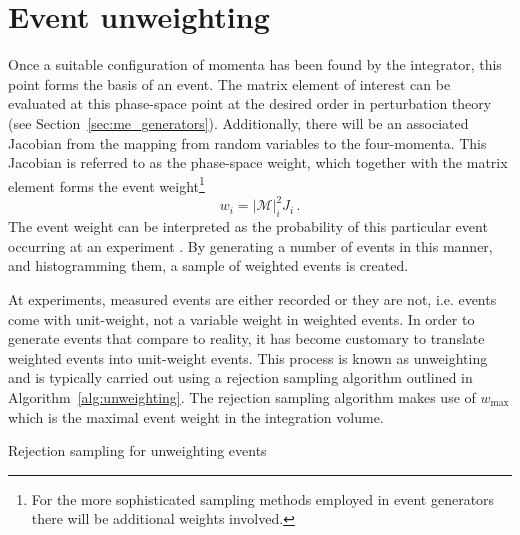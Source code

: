 \documentclass[main.tex]{subfiles}
\begin{document}
    \section{Event unweighting}\label{sec:unweighting}
    Once a suitable configuration of momenta
    has been found by the integrator, this point forms the basis of an
    event. The matrix element of interest can be evaluated at
    this phase-space point at the desired order in perturbation
    theory (see Section~\ref{sec:me_generators}). Additionally, there will be an associated Jacobian
    from the mapping from random variables to the four-momenta.
    This Jacobian is referred to as the phase-space weight, which together
    with the matrix element forms the event weight\footnote{For
    the more sophisticated sampling methods employed in event generators
    there will be additional weights involved.}
    \begin{equation}\label{eqn:event_weight}
        w_{i} = |\mathcal{M}|_{i}^{2} J_{i} \, .
    \end{equation}
    The event weight can be interpreted as the probability
    of this particular event occurring at an experiment \cite{Plehn:2009nd}.
    By generating a number of events in this manner,
    and histogramming them, a sample of weighted events is created.
    
    At experiments, measured events are either recorded
    or they are not, i.e. events come with unit-weight,
    not a variable weight in weighted events. In order to generate events that
    compare to reality, it has become customary to translate
    weighted events into unit-weight events.
    This process is known as unweighting and is typically
    carried out using a rejection sampling algorithm
    outlined in Algorithm~\ref{alg:unweighting}. The rejection
    sampling algorithm makes use of $w_{\mathrm{max}}$ which is the
    maximal event weight in the integration volume.

    \begin{algorithm}
        \caption{Rejection sampling for unweighting events}\label{alg:unweighting}
    \end{algorithm}
\end{document}
